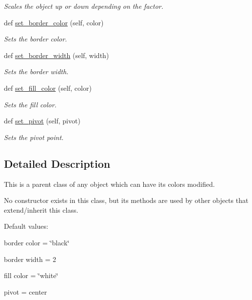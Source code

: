 \begin{DoxyCompactItemize}
\begin{DoxyCompactList}\small\item\em Scales the object up or down depending on the factor. \end{DoxyCompactList}\item 
def \mbox{\hyperlink{classcs110graphics__v2_1_1Fillable_a1da4fb755538b915c79913f1a17dcbf7}{set\+\_\+border\+\_\+color}} (self, color)
\begin{DoxyCompactList}\small\item\em Sets the border color. \end{DoxyCompactList}\item 
def \mbox{\hyperlink{classcs110graphics__v2_1_1Fillable_a6576e9d1634853c8784107d505b50c15}{set\+\_\+border\+\_\+width}} (self, width)
\begin{DoxyCompactList}\small\item\em Sets the border width. \end{DoxyCompactList}\item 
def \mbox{\hyperlink{classcs110graphics__v2_1_1Fillable_aa3bc1ae6a16af93e845af7174f67946d}{set\+\_\+fill\+\_\+color}} (self, color)
\begin{DoxyCompactList}\small\item\em Sets the fill color. \end{DoxyCompactList}\item 
def \mbox{\hyperlink{classcs110graphics__v2_1_1Fillable_a1be2f575dbf8963ecba1e9e9adec1206}{set\+\_\+pivot}} (self, pivot)
\begin{DoxyCompactList}\small\item\em Sets the pivot point. \end{DoxyCompactList}\end{DoxyCompactItemize}


\subsection{Detailed Description}
This is a parent class of any object which can have its colors modified. 

No constructor exists in this class, but its methods are used by other objects that extend/inherit this class.

Default values\+:
\begin{DoxyItemize}
\item border color = \char`\"{}black\char`\"{}
\item border width = 2
\item fill color = \char`\"{}white\char`\"{}
\item pivot = center 
\end{DoxyItemize}


